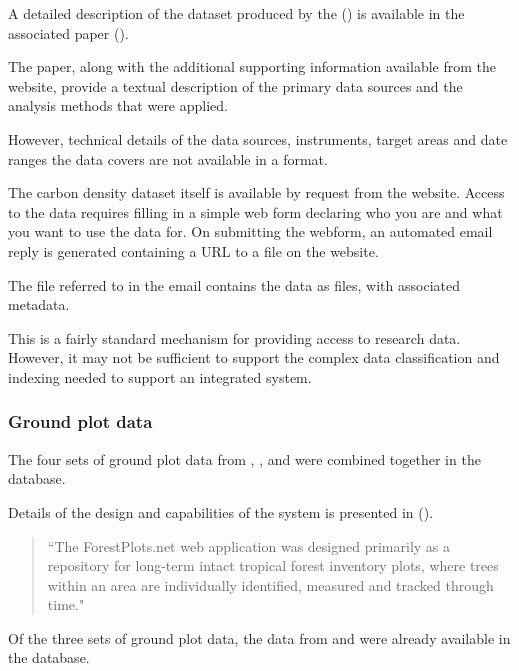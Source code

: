 \documentclass{article}
\begin{document}
A detailed description of the dataset produced by the 
(\cite{whrc}) is available in the associated paper (\cite{baccini-2012}).

The paper, along with the additional supporting information available from
the \cite{journal-nature} website,
provide a textual description
of the primary data sources
and the analysis methods that were applied.

However, technical details of the data sources, instruments, target areas
and date ranges the data covers are not available in a
\cite{machine-readable}
format.

The carbon density dataset itself is available by request from the
\cite{whrc-data} website. Access to the data requires filling in a simple
web form declaring who you are and what you want to use the data for. On
submitting the webform, an automated email reply is generated containing
a URL to a \cite{format-zip} file on the \cite{whrc} website.

The \cite{format-zip} file referred to in the email contains the data as
\cite{format-geotiff} files, with associated \cite{format-world} metadata.

This is a fairly standard mechanism for providing access to research
data. However, it may not be sufficient to support the complex data
classification and indexing needed to support an integrated
\cite{vo} system.

\subsubsection{Ground plot data}

The four sets of ground plot data from \cite{rainfor}, \cite{atdn},
\cite{team} and \cite{ppbio} were combined together in the \cite{forest-plots}
database.

Details of the design and capabilities of the \cite{forest-plots} system
is presented in  (\cite{gonzalez-2011}).

\begin{quote}
``The ForestPlots.net web application was designed primarily as a repository
for long-term intact tropical forest inventory plots, where trees within
an area are individually identified, measured and tracked through time."
\end{quote}

Of the three sets of ground plot data, the data from \cite{rainfor} and
\cite{atdn} were already available in the \cite{forest-plots} database.
\end{document}
